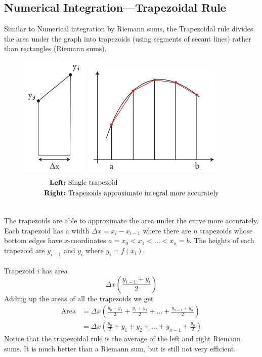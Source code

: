 \documentclass{report}
\begin{document}
\subsection{Numerical Integration---Trapezoidal Rule} %
Similar to Numerical integration by Riemann sums, the Trapezoidal rule
divides the area under the graph into trapezoids (using segments of secant lines)
rather than rectangles (Riemann sums).
\begin{figure}[h]
\includegraphics[width=3.2cm]{Capture34}
\includegraphics[width=6.8cm]{Capture35}\\
\centering
\begin{align*}
\text{\textbf{Left:}}&\text{ Single trapezoid}\\
\text{\textbf{Right:}}&\text{ Trapezoids approximate integral more accurately}
\end{align*}
\end{figure}\\
The trapezoids are able to approximate the area under the curve more accurately. 
Each trapezoid has a width $\Delta x=x_i-x_{i-1}$ where there
are $n$ trapezoids whose bottom edges have $x$-coordinates 
$a=x_0<x_1<\ldots<x_n=b$. The heights of each trapezoid are $y_{i-1}$ and $y_i$
where $y_{i}=f(x_i)$.\\
\vspace{1mm}\\
Trapezoid $i$ has area 
\begin{equation*}
\Delta x\left(\frac{y_{i-1}+y_i}{2}\right)
\end{equation*}
Adding up the areas of all the trapezoids we get
\begin{align*}
\text{Area}&=\Delta x\left(\frac{y_0+y_1}{2}+
\frac{y_1+y_2}{2}+\ldots+\frac{y_{n-1}+y_n}{2}\right)\\
&=\Delta x\left(\frac{y_0}{2}+y_1+y_2+\ldots+y_{n-1}+
\frac{y_n}{2}\right)
\end{align*}
Notice that the trapezoidal rule is the average of the left and right
Riemann sums. It is much better than a Riemann sum, but is still not very efficient.
\newpage
\end{document}

